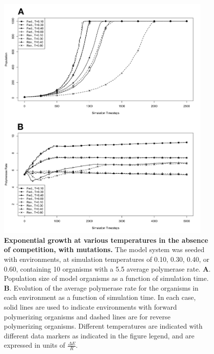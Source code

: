 \begin{figure}[!ht]
	\begin{center}
		\includegraphics[width=0.95\textwidth]{temp_incr_mut}
	\end{center}
	\caption{
	{\bf Exponential growth at various temperatures in the absence of competition, with mutations.}  The model system was seeded with environments, at simulation temperatures of 0.10, 0.30, 0.40, or 0.60, containing 10 organisms with a 5.5 average polymerase rate. \textbf{A}. Population size of model organisms as a function of simulation time. \textbf{B}. Evolution of the average polymerase rate for the organisms in each environment as a function of simulation time. In each case, solid lines are used to indicate environments with forward polymerizing organisms and dashed lines are for reverse polymerizing organisms. Different temperatures are indicated with different data markers as indicated in the figure legend, and are expressed in units of $\frac{\Delta E}{R}$.
	}
	\label{fig:temp_incr_mut}
\end{figure}

